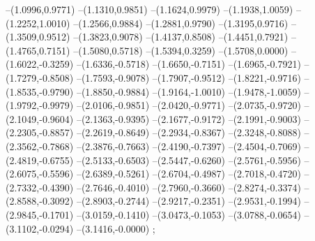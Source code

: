 {--(1.0996,0.9771)
--(1.1310,0.9851)
--(1.1624,0.9979)
--(1.1938,1.0059)
--(1.2252,1.0010)
--(1.2566,0.9884)
--(1.2881,0.9790)
--(1.3195,0.9716)
--(1.3509,0.9512)
--(1.3823,0.9078)
--(1.4137,0.8508)
--(1.4451,0.7921)
--(1.4765,0.7151)
--(1.5080,0.5718)
--(1.5394,0.3259)
--(1.5708,0.0000)
--(1.6022,-0.3259)
--(1.6336,-0.5718)
--(1.6650,-0.7151)
--(1.6965,-0.7921)
--(1.7279,-0.8508)
--(1.7593,-0.9078)
--(1.7907,-0.9512)
--(1.8221,-0.9716)
--(1.8535,-0.9790)
--(1.8850,-0.9884)
--(1.9164,-1.0010)
--(1.9478,-1.0059)
--(1.9792,-0.9979)
--(2.0106,-0.9851)
--(2.0420,-0.9771)
--(2.0735,-0.9720)
--(2.1049,-0.9604)
--(2.1363,-0.9395)
--(2.1677,-0.9172)
--(2.1991,-0.9003)
--(2.2305,-0.8857)
--(2.2619,-0.8649)
--(2.2934,-0.8367)
--(2.3248,-0.8088)
--(2.3562,-0.7868)
--(2.3876,-0.7663)
--(2.4190,-0.7397)
--(2.4504,-0.7069)
--(2.4819,-0.6755)
--(2.5133,-0.6503)
--(2.5447,-0.6260)
--(2.5761,-0.5956)
--(2.6075,-0.5596)
--(2.6389,-0.5261)
--(2.6704,-0.4987)
--(2.7018,-0.4720)
--(2.7332,-0.4390)
--(2.7646,-0.4010)
--(2.7960,-0.3660)
--(2.8274,-0.3374)
--(2.8588,-0.3092)
--(2.8903,-0.2744)
--(2.9217,-0.2351)
--(2.9531,-0.1994)
--(2.9845,-0.1701)
--(3.0159,-0.1410)
--(3.0473,-0.1053)
--(3.0788,-0.0654)
--(3.1102,-0.0294)
--(3.1416,-0.0000)
;}
